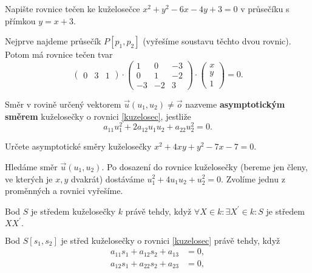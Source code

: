 \begin{priklad}
Napište rovnice tečen ke kuželosečce $x^2+y^2-6x-4y+3=0$ v průsečíku s přímkou $y=x+3$.
\end{priklad}

\begin{reseni}
Nejprve najdeme průsečík $P[p_1,p_2]$ (vyřešíme soustavu těchto dvou rovnic).
Potom má rovnice tečen tvar
$$\begin{pmatrix}
    0 & 3 & 1
\end{pmatrix}\cdot \begin{pmatrix}
    1 & 0 & -3\\
    0 & 1 & -2 \\
    -3 & -2 & 3
\end{pmatrix}\cdot \begin{pmatrix}
    x \\
    y \\
    1
\end{pmatrix}=0.$$
\end{reseni}

\begin{definition}
    Směr v rovině určený vektorem $\vec u(u_1, u_2)\ne \vec o$ nazveme
    \textbf{asymptotickým směrem} kuželosečky o rovnici \ref{kuzelosec}, jestliže
    $$a_{11}u_1^2 + 2a_{12}u_1u_2+a_{22}u_2^2=0.$$
\end{definition}

\begin{priklad}
Určete asymptotické směry kuželosečky $x^2+4xy+y^2-7x-7=0.$
\end{priklad}

\begin{reseni}
Hledáme směr $\vec u(u_1,u_2).$ Po dosazení do rovnice kuželosečky (bereme jen
členy, ve kterých je $x,y$ dvakrát) dostáváme $u_1^2+4u_1u_2+u_2^2=0.$ Zvolíme jednu
z proměnných a rovnici vyřešíme.
\end{reseni}

\begin{definition}
    Bod $S$ je středem kuželosečky $k$ právě tehdy, když $\forall X\in k:\exists X^\prime\in k: S$ je středem $XX^\prime.$
\end{definition}

\begin{veta}
    Bod $S[s_1,s_2]$ je střed kuželosečky o rovnici \ref{kuzelosec} právě tehdy, když
    \begin{align*}
        a_{11}s_1 + a_{12}s_2+a_{13}&=0,\\
        a_{12}s_1 + a_{22}s_2 + a_{23}&=0,
    \end{align*}
\end{veta}

